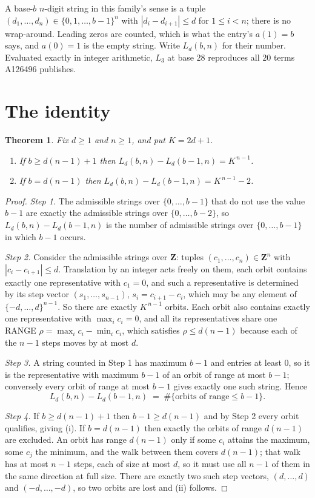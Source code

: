 \documentclass[11pt,a4paper]{article}
\theoremstyle{plain}
\newtheorem{theorem}{Theorem}
\theoremstyle{definition}
\begin{document}
A base-$b$ $n$-digit string in this family's sense is a tuple
$(d_1,\dots,d_n)\in\{0,1,\dots,b-1\}^{n}$ with $|d_i-d_{i+1}|\le d$ for $1\le i<n$; there
is no wrap-around. Leading zeros are counted, which is what the entry's $a(1)=b$ says, and
$a(0)=1$ is the empty string. Write $L_d(b,n)$ for their number. Evaluated exactly in integer
arithmetic, $L_{3}$ at base $28$ reproduces all $20$ terms A126496 publishes.

\section{The identity}

\begin{theorem}
Fix $d\ge1$ and $n\ge1$, and put $K=2d+1$.
\begin{enumerate}
\item[(i)] If $b\ge d(n-1)+1$ then $L_d(b,n)-L_d(b-1,n)=K^{\,n-1}$.
\item[(ii)] If $b=d(n-1)$ then $L_d(b,n)-L_d(b-1,n)=K^{\,n-1}-2$.
\end{enumerate}
\end{theorem}

\begin{proof}
\emph{Step 1.} The admissible strings over $\{0,\dots,b-1\}$ that do not use the value $b-1$
are exactly the admissible strings over $\{0,\dots,b-2\}$, so $L_d(b,n)-L_d(b-1,n)$ is the
number of admissible strings over $\{0,\dots,b-1\}$ in which $b-1$ occurs.

\emph{Step 2.} Consider the admissible strings over $\mathbf{Z}$: tuples
$(c_1,\dots,c_n)\in\mathbf{Z}^{n}$ with $|c_i-c_{i+1}|\le d$. Translation by an integer acts
freely on them, each orbit contains exactly one representative with $c_1=0$, and such a
representative is determined by its step vector $(s_1,\dots,s_{n-1})$, $s_i=c_{i+1}-c_i$,
which may be any element of $\{-d,\dots,d\}^{n-1}$. So there are exactly $K^{\,n-1}$ orbits.
Each orbit also contains exactly one representative with $\max_i c_i=0$, and all its
representatives share one RANGE $\rho=\max_ic_i-\min_ic_i$, which satisfies
$\rho\le d(n-1)$ because each of the $n-1$ steps moves by at most $d$.

\emph{Step 3.} A string counted in Step 1 has maximum $b-1$ and entries at least $0$, so it is
the representative with maximum $b-1$ of an orbit of range at most $b-1$; conversely every orbit
of range at most $b-1$ gives exactly one such string. Hence
\[
L_d(b,n)-L_d(b-1,n)\;=\;\#\{\text{orbits of range}\le b-1\} .
\]

\emph{Step 4.} If $b\ge d(n-1)+1$ then $b-1\ge d(n-1)$ and by Step 2 every orbit qualifies,
giving (i). If $b=d(n-1)$ then exactly the orbits of range $d(n-1)$ are excluded. An orbit has
range $d(n-1)$ only if some $c_i$ attains the maximum, some $c_j$ the minimum, and the walk
between them covers $d(n-1)$; that walk has at most $n-1$ steps, each of size at most $d$, so it
must use all $n-1$ of them in the same direction at full size. There are exactly two such step
vectors, $(d,\dots,d)$ and $(-d,\dots,-d)$, so two orbits are lost and (ii) follows.
\end{proof}
\end{document}
